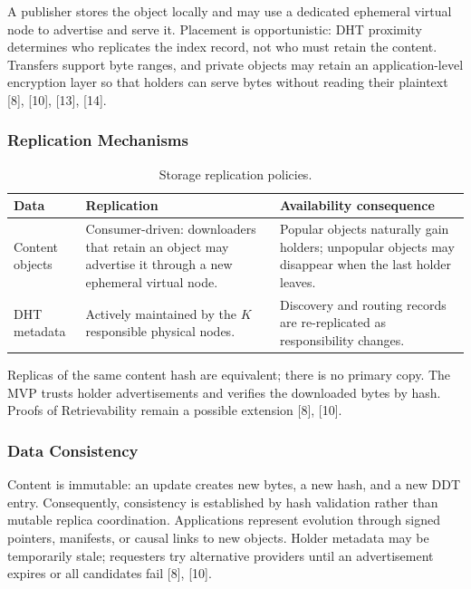 \documentclass[12pt]{article}
\begin{document}
A publisher stores the object locally and may use a dedicated ephemeral virtual node
to advertise and serve it. Placement is opportunistic: DHT proximity determines who
replicates the index record, not who must retain the content. Transfers support byte
ranges, and private objects may retain an application-level encryption layer so that
holders can serve bytes without reading their plaintext [8], [10], [13], [14].

\subsubsection{Replication Mechanisms}

\begin{table}[H]
\centering
\caption{Storage replication policies.}
\label{tab:storage-replication-policies}
\begin{tabularx}{\textwidth}{L{0.24\textwidth} Y Y}
\toprule
\textbf{Data} & \textbf{Replication} & \textbf{Availability consequence} \\
\midrule
Content objects & Consumer-driven: downloaders that retain an object may advertise
it through a new ephemeral virtual node. & Popular objects naturally gain holders;
unpopular objects may disappear when the last holder leaves. \\
DHT metadata & Actively maintained by the $K$ responsible physical nodes. &
Discovery and routing records are re-replicated as responsibility changes. \\
\bottomrule
\end{tabularx}
\end{table}

Replicas of the same content hash are equivalent; there is no primary copy. The MVP
trusts holder advertisements and verifies the downloaded bytes by hash. Proofs of
Retrievability remain a possible extension [8], [10].

\subsubsection{Data Consistency}

Content is immutable: an update creates new bytes, a new hash, and a new DDT entry.
Consequently, consistency is established by hash validation rather than mutable
replica coordination. Applications represent evolution through signed pointers,
manifests, or causal links to new objects. Holder metadata may be temporarily stale;
requesters try alternative providers until an advertisement expires or all candidates
fail [8], [10].
\end{document}
